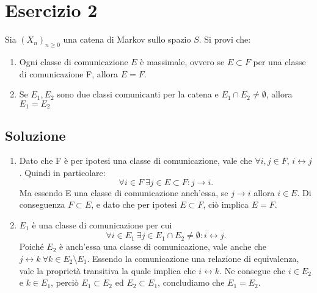 \documentclass[
	12pt, %
]{fphw}
\begin{document}
\newpage
\section*{Esercizio 2}
\begin{problem}
	\smallskip
	Sia $(X_n)_{n \ge 0}$ una catena di Markov sullo spazio $S$. Si provi che:
	\begin{enumerate}
		\item Ogni classe di comunicazione $E$  è massimale, 
		ovvero se $E \subset F$ per una classe di comunicazione F, allora $E = F$.
		\item Se $E_1, E_2$ sono due classi comunicanti per la catena e
		$E_1 \cap E_2 \ne \emptyset$, allora $E_1 = E_2$
	\end{enumerate}
	\smallskip
\end{problem}
\medskip
\subsection*{Soluzione}
	\begin{enumerate}
		\item Dato che F è per ipotesi una classe di comunicazione, vale che $\forall i, j \in F\text{, }i\longleftrightarrow j$.
		Quindi in particolare:
		\begin{equation*}
			\forall i \in F ~ \exists j \in E \subset F : j \to i.
		\end{equation*}
		Ma essendo E una classe di comunicazione anch'essa, se $j\longrightarrow i$ allora $i \in E$.
		Di conseguenza $F\subset E$, e dato che per ipotesi $E\subset F$, ciò implica $E=F$.
		\item $E_1$ è una classe di comunicazione per cui
		\begin{equation*}
			\forall i \in E_1 ~ \exists j \in E_1 \cap E_2 \ne \emptyset : i \leftrightarrow j.
		\end{equation*}
		Poiché $E_2$ è anch'essa una classe di comunicazione, vale anche che $j \leftrightarrow k ~ \forall k \in E_2 \setminus E_1$.
		Essendo la comunicazione una relazione di equivalenza, vale la proprietà transitiva la quale implica che $i \leftrightarrow k$.
		Ne consegue che $i \in E_2$ e $k \in E_1$, perciò $E_1 \subset E_2$ ed $E_2 \subset E_1$, concludiamo che $E_1 = E_2$.
	\end{enumerate}

\end{document}
